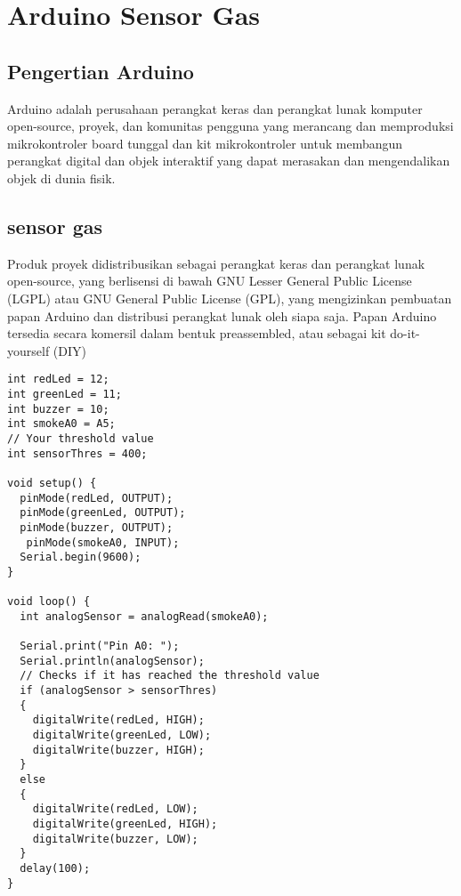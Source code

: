 \section{Arduino Sensor Gas}
\subsection{Pengertian Arduino}
Arduino adalah perusahaan perangkat keras dan perangkat lunak komputer open-source, proyek, dan komunitas pengguna yang merancang dan memproduksi mikrokontroler board tunggal dan kit mikrokontroler untuk membangun perangkat digital dan objek interaktif yang dapat merasakan dan mengendalikan objek di dunia fisik.
\subsection{sensor gas}
Produk proyek didistribusikan sebagai perangkat keras dan perangkat lunak open-source, yang berlisensi di bawah GNU Lesser General Public License (LGPL) atau GNU General Public License (GPL), yang mengizinkan pembuatan papan Arduino dan distribusi perangkat lunak oleh siapa saja. Papan Arduino tersedia secara komersil dalam bentuk preassembled, atau sebagai kit do-it-yourself (DIY)\cite{kushner2011making}


\begin{verbatim}
int redLed = 12;
int greenLed = 11;
int buzzer = 10;
int smokeA0 = A5;
// Your threshold value
int sensorThres = 400;

void setup() {
  pinMode(redLed, OUTPUT);
  pinMode(greenLed, OUTPUT);
  pinMode(buzzer, OUTPUT);
   pinMode(smokeA0, INPUT);
  Serial.begin(9600);
}

void loop() {
  int analogSensor = analogRead(smokeA0);

  Serial.print("Pin A0: ");
  Serial.println(analogSensor);
  // Checks if it has reached the threshold value
  if (analogSensor > sensorThres)
  {
    digitalWrite(redLed, HIGH);
    digitalWrite(greenLed, LOW);
    digitalWrite(buzzer, HIGH);
  }
  else
  {
    digitalWrite(redLed, LOW);
    digitalWrite(greenLed, HIGH);
    digitalWrite(buzzer, LOW);
  }
  delay(100);
}
\end{verbatim}